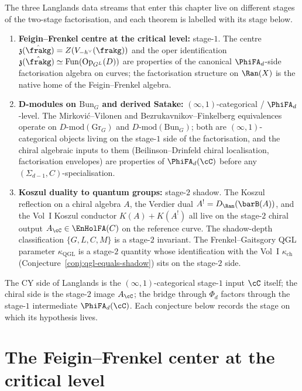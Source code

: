 \begin{remark}
\label{rem:gl-stage-discipline}
The three Langlands data streams that enter this chapter live on
different stages of the two-stage factorisation, and each theorem is
labelled with its stage below.
\begin{enumerate}[label=\textup{(\roman*)},leftmargin=2.4em]
\item \textbf{Feigin--Frenkel centre at the critical level:} stage-$1$.
The centre $\mathfrak{z}(\hat{\frakg}) = Z(V_{-h^\vee}(\frakg))$ and the
oper identification $\mathfrak{z}(\hat{\frakg}) \simeq
\mathrm{Fun}(\mathrm{Op}_{G^L}(D))$ are properties of the canonical
$\PhiFA_d$-side factorisation algebra on curves; the factorisation
structure on $\Ran(X)$ is the native home of the Feigin--Frenkel
algebra.
\item \textbf{D-modules on $\mathrm{Bun}_G$ and derived Satake:}
$(\infty, 1)$-categorical / $\PhiFA_d$-level. The Mirkovi\'c--Vilonen and
Bezrukavnikov--Finkelberg equivalences operate on
$D\text{-}\mathrm{mod}(\mathrm{Gr}_G)$ and $D\text{-}\mathrm{mod}(\mathrm{Bun}_G)$;
both are $(\infty, 1)$-categorical objects living on the stage-$1$ side
of the factorisation, and the chiral algebraic inputs to them
(Beilinson--Drinfeld chiral localisation, factorisation envelopes) are
properties of $\PhiFA_d(\cC)$ before any $(\Sigma_{d-1}, C)$-specialisation.
\item \textbf{Koszul duality to quantum groups:} stage-$2$ shadow. The
Koszul reflection on a chiral algebra $A$, the Verdier dual
$A^! = D_{\Ran}(\barB(A))$, and the Vol~I Koszul conductor $K(A) + K(A^!)$
all live on the stage-$2$ chiral output $A_\cC \in \EnHolFA(C)$ on the
reference curve. The shadow-depth classification
$\{G, L, C, M\}$ is a stage-$2$ invariant. The Frenkel--Gaitsgory QGL
parameter $\kappa_{\mathrm{QGL}}$ is a stage-$2$ quantity whose
identification with the Vol~I $\kappa_{\mathrm{ch}}$
(Conjecture~\ref{conj:qgl-equals-shadow}) sits on the stage-$2$ side.
\end{enumerate}
The CY side of Langlands is the $(\infty, 1)$-categorical stage-$1$
input $\cC$ itself; the chiral side is the stage-$2$ image $A_\cC$; the
bridge through $\Phi_d$ factors through the stage-$1$ intermediate
$\PhiFA_d(\cC)$. Each conjecture below records the stage on which its
hypothesis lives.
\end{remark}


\section{The Feigin--Frenkel center at the critical level}
\label{sec:feigin-frenkel}

